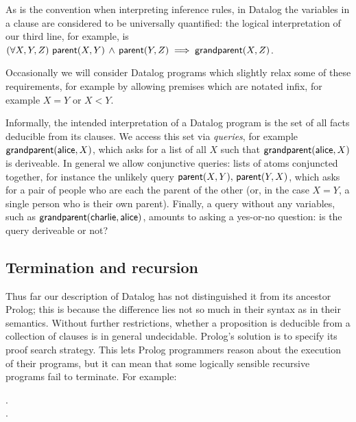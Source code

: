 As is the convention when interpreting inference rules, in Datalog the variables
in a clause are considered to be universally quantified: the logical
interpretation of our third line, for example, is $\fa{X, Y, Z} \atom{parent}{X,
  Y} \wedge \atom{parent}{Y, Z} \implies \atom{grandparent}{X, Z}$.

Occasionally we will consider Datalog programs which slightly relax some of
these requirements, for example by allowing premises which are notated infix,
for example $X = Y$ or $X < Y$.

Informally, the intended interpretation of a Datalog program is the set of all
facts deducible from its clauses. We access this set via \emph{queries}, for
example $\text{\sffamily grandparent}({\textsf{alice},X})$, which asks for a list of all $X$
such that $\text{\sffamily grandparent}({\textsf{alice},X})$ is deriveable. In general we
allow conjunctive queries: lists of atoms conjuncted together, for instance the
unlikely query $\text{\sffamily parent}({X,Y}) ,\, \text{\sffamily parent}({Y,X})$, which asks for a
pair of people who are each the parent of the other (or, in the case $X = Y$, a
single person who is their own parent). Finally, a query without any variables,
such as $\text{\sffamily grandparent}({\textsf{charlie}, \textsf{alice}})$, amounts to asking a
yes-or-no question: is the query deriveable or not?



\subsection{Termination and recursion}

Thus far our description of Datalog has not distinguished it from its ancestor
Prolog; this is because the difference lies not so much in their syntax as in
their semantics.
%
Without further restrictions, whether a proposition is deducible from a
collection of clauses is in general undecidable.
%
Prolog's solution is to specify its proof search strategy.
%
This lets Prolog programmers reason about the execution of their programs, but
it can mean that some logically sensible recursive programs fail to terminate.
For example:

\begin{datalog}
 \gets {} \conj {}.\\
 \gets {}.
\end{datalog}

